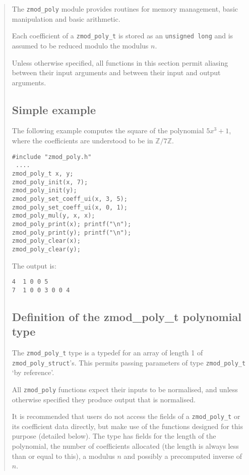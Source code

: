 \documentclass[a4paper,10pt]{article}
\newcommand{\Z}{\mathbb{Z}}
\newcommand{\code}{\lstinline}
\begin{document}
\begin{quote}
The \code{zmod_poly} module provides routines for memory management, basic manipulation and basic arithmetic.

Each coefficient of a \code{zmod_poly_t} is stored as an \code{unsigned long} and is assumed to be reduced modulo the modulus $n$.

Unless otherwise specified, all functions in this section permit aliasing between their input arguments and between their input and output arguments. 

\subsection{Simple example}

The following example computes the square of the polynomial $5x^3 + 1$, where the coefficients are understood to be in $\Z/7\Z$.

\begin{lstlisting}
#include "zmod_poly.h"
 ....
zmod_poly_t x, y;
zmod_poly_init(x, 7);
zmod_poly_init(y);
zmod_poly_set_coeff_ui(x, 3, 5);
zmod_poly_set_coeff_ui(x, 0, 1);
zmod_poly_mul(y, x, x);
zmod_poly_print(x); printf("\n");
zmod_poly_print(y); printf("\n");
zmod_poly_clear(x);
zmod_poly_clear(y);
\end{lstlisting}

The output is:

\begin{lstlisting}
4  1 0 0 5
7  1 0 0 3 0 0 4
\end{lstlisting}

\subsection{Definition of the zmod\_poly\_t polynomial type}

The \code{zmod_poly_t} type is a typedef for an array of length 1 of \code{zmod_poly_struct}'s. This permits passing parameters  of type \code{zmod_poly_t} `by reference'. 

All \code{zmod_poly} functions expect their inputs to be normalised, and unless otherwise specified they produce output that is normalised. 

It is recommended that users do not access the fields of a \code{zmod_poly_t} or its coefficient data directly, but make use of the functions designed for this purpose (detailed below). The type has fields for the length of the polynomial, the number of coefficients allocated (the length is always less than or equal to this), a modulus $n$ and possibly a precomputed inverse of $n$.


\end{quote}
\end{document}
